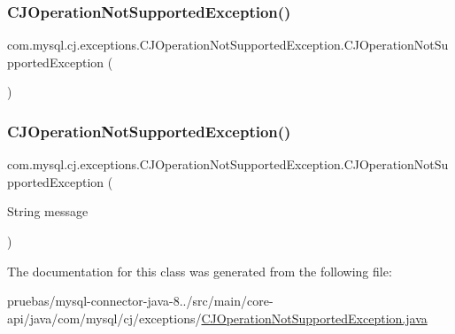 \subsubsection{\texorpdfstring{C\+J\+Operation\+Not\+Supported\+Exception()}{CJOperationNotSupportedException()}\hspace{0.1cm}{\footnotesize\ttfamily [1/2]}}
{\footnotesize\ttfamily com.\+mysql.\+cj.\+exceptions.\+C\+J\+Operation\+Not\+Supported\+Exception.\+C\+J\+Operation\+Not\+Supported\+Exception (\begin{DoxyParamCaption}{ }\end{DoxyParamCaption})}

\mbox{\label{classcom_1_1mysql_1_1cj_1_1exceptions_1_1_c_j_operation_not_supported_exception_a14e5456561ad21542cfce871cbe41307}} 
\subsubsection{\texorpdfstring{C\+J\+Operation\+Not\+Supported\+Exception()}{CJOperationNotSupportedException()}\hspace{0.1cm}{\footnotesize\ttfamily [2/2]}}
{\footnotesize\ttfamily com.\+mysql.\+cj.\+exceptions.\+C\+J\+Operation\+Not\+Supported\+Exception.\+C\+J\+Operation\+Not\+Supported\+Exception (\begin{DoxyParamCaption}\item[{String}]{message }\end{DoxyParamCaption})}



The documentation for this class was generated from the following file\+:\begin{DoxyCompactItemize}
\item 
pruebas/mysql-\/connector-\/java-\/8../src/main/core-\/api/java/com/mysql/cj/exceptions/\mbox{\hyperlink{_c_j_operation_not_supported_exception_8java}{C\+J\+Operation\+Not\+Supported\+Exception.\+java}}\end{DoxyCompactItemize}
